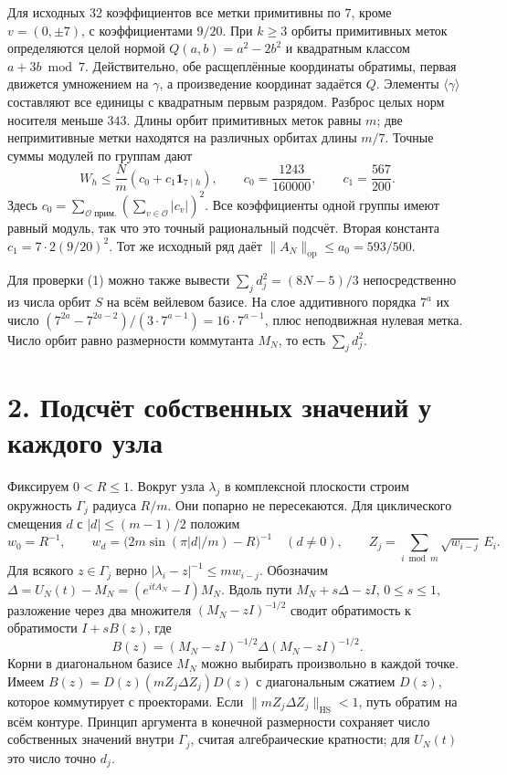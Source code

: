 \documentclass[11pt,a4paper]{article}
\newcommand{\sect}[1]{\section*{\sffamily\color{ink}#1}}
\newcommand{\op}{\mathrm{op}}
\newcommand{\HS}{\mathrm{HS}}
\begin{document}
Для исходных 32 коэффициентов все метки примитивны по \(7\), кроме \(v=(0,\pm7)\), с коэффициентами \(9/20\). При \(k\ge3\) орбиты примитивных меток определяются целой нормой \(Q(a,b)=a^2-2b^2\) и квадратным классом \(a+3b\bmod7\). Действительно, обе расщеплённые координаты обратимы, первая движется умножением на \(\gamma\), а произведение координат задаётся \(Q\). Элементы \(\langle\gamma\rangle\) составляют все единицы с квадратным первым разрядом. Разброс целых норм носителя меньше \(343\). Длины орбит примитивных меток равны \(m\); две непримитивные метки находятся на различных орбитах длины \(m/7\). Точные суммы модулей по группам дают
\begin{equation}
   W_h\le \frac{N}{m}\left(c_0+c_1\mathbf1_{7\mid h}\right),
   \qquad c_0=\frac{1243}{160000},\qquad c_1=\frac{567}{200}.
                                                             \tag{2}
\end{equation}
Здесь \(c_0=\sum_{\mathcal O\text{ прим.}}(\sum_{v\in\mathcal O}|c_v|)^2\). Все коэффициенты одной группы имеют равный модуль, так что это точный рациональный подсчёт. Вторая константа \(c_1=7\cdot2(9/20)^2\). Тот же исходный ряд даёт \(\|A_N\|_{\op}\le a_0=593/500\).

Для проверки (1) можно также вывести \(\sum_j d_j^2=(8N-5)/3\) непосредственно из числа орбит \(S\) на всём вейлевом базисе. На слое аддитивного порядка \(7^a\) их число \((7^{2a}-7^{2a-2})/(3\cdot7^{a-1})=16\cdot7^{a-1}\), плюс неподвижная нулевая метка. Число орбит равно размерности коммутанта \(M_N\), то есть \(\sum_j d_j^2\).
\newpage
\sect{2. Подсчёт собственных значений у каждого узла}
Фиксируем \(0<R\le1\). Вокруг узла \(\lambda_j\) в комплексной плоскости строим окружность \(\Gamma_j\) радиуса \(R/m\). Они попарно не пересекаются. Для циклического смещения \(d\) с \(|d|\le(m-1)/2\) положим
\[
 w_0=R^{-1},\qquad
 w_d=\bigl(2m\sin(\pi |d|/m)-R\bigr)^{-1}\quad(d\ne0),\qquad
 Z_j=\sum_{i\bmod m}\sqrt{w_{i-j}}\,E_i.
\]
Для всякого \(z\in\Gamma_j\) верно \(|\lambda_i-z|^{-1}\le m w_{i-j}\). Обозначим
\(\Delta=U_N(t)-M_N=(e^{itA_N}-I)M_N\).
Вдоль пути \(M_N+s\Delta-zI\), \(0\le s\le1\), разложение через два множителя \((M_N-zI)^{-1/2}\) сводит обратимость к обратимости \(I+s B(z)\), где
\[
     B(z)=(M_N-zI)^{-1/2}\Delta(M_N-zI)^{-1/2}.
\]
Корни в диагональном базисе \(M_N\) можно выбирать произвольно в каждой точке. Имеем \(B(z)=D(z)(m Z_j\Delta Z_j)D(z)\) с диагональным сжатием \(D(z)\), которое коммутирует с проекторами. Если \(\|m Z_j\Delta Z_j\|_{\HS}<1\), путь обратим на всём контуре. Принцип аргумента в конечной размерности сохраняет число собственных значений внутри \(\Gamma_j\), считая алгебраические кратности; для \(U_N(t)\) это число точно \(d_j\).
\end{document}

